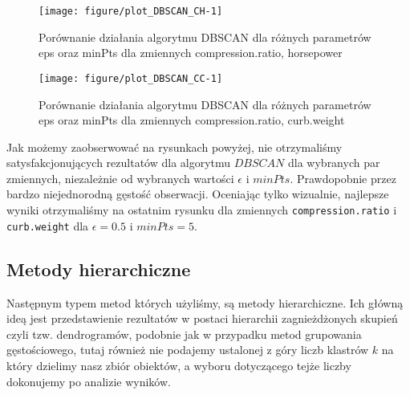 \documentclass[12pt, a4paper]{article}\usepackage[]{graphicx}\usepackage[]{xcolor}
\makeatletter
\def\maxwidth{ %
  \ifdim\Gin@nat@width>\linewidth
    \linewidth
  \else
    \Gin@nat@width
  \fi
}
\newenvironment{knitrout}{}{} %
\makeatother
\begin{document}
\begin{knitrout}
\color{fgcolor}\begin{figure}[H]

{\centering \texttt{[image: figure/plot\_DBSCAN\_CH-1]} 

}

\caption[Porównanie działania algorytmu DBSCAN dla różnych parametrów eps oraz minPts dla zmiennych compression.ratio, horsepower]{Porównanie działania algorytmu DBSCAN dla różnych parametrów eps oraz minPts dla zmiennych compression.ratio, horsepower}\label{fig:plot_DBSCAN_CH}
\end{figure}

\end{knitrout}

\begin{knitrout}
\color{fgcolor}\begin{figure}[H]

{\centering \texttt{[image: figure/plot\_DBSCAN\_CC-1]} 

}

\caption[Porównanie działania algorytmu DBSCAN dla różnych parametrów eps oraz minPts dla zmiennych compression.ratio, curb.weight]{Porównanie działania algorytmu DBSCAN dla różnych parametrów eps oraz minPts dla zmiennych compression.ratio, curb.weight}\label{fig:plot_DBSCAN_CC}
\end{figure}

\end{knitrout}

Jak możemy zaobserwować na rysunkach powyżej, nie otrzymaliśmy satysfakcjonujących rezultatów dla algorytmu $DBSCAN$ dla wybranych par zmiennych, niezależnie od wybranych wartości $\epsilon$ i $minPts$. Prawdopobnie przez bardzo niejednorodną gęstość obserwacji. Oceniając tylko wizualnie, najlepsze wyniki otrzymaliśmy na ostatnim rysunku dla zmiennych \texttt{compression.ratio} i \texttt{curb.weight} dla $\epsilon = 0.5$ i $minPts = 5$.


\subsection{Metody hierarchiczne}

Następnym typem metod których użyliśmy, są metody hierarchiczne. Ich główną ideą jest przedstawienie rezultatów w postaci hierarchii zagnieżdżonych skupień czyli tzw. dendrogramów, podobnie jak w przypadku metod grupowania gęstościowego, tutaj również nie podajemy ustalonej z góry liczb klastrów $k$ na który dzielimy nasz zbiór obiektów, a wyboru dotyczącego tejże liczby dokonujemy po analizie wyników.
\end{document}
